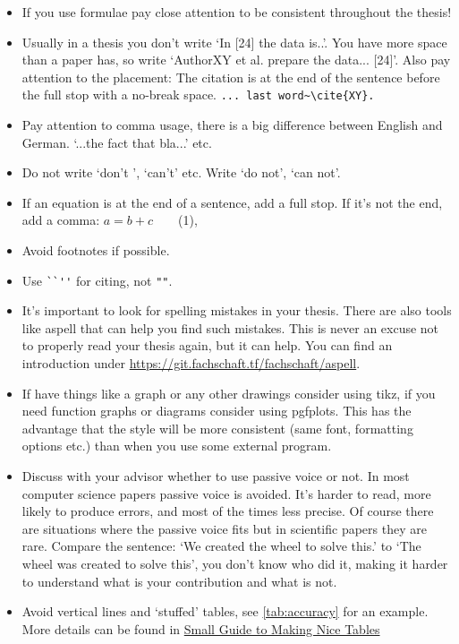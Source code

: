    \begin{itemize}

        \item If you use formulae pay close attention to be consistent throughout the thesis!

        \item Usually  in a thesis you don't write `In [24] the data is..'. You have more space than a paper has, so write `AuthorXY et al. prepare the data... [24]'. Also pay attention to the placement: The citation is at the end of the sentence before the full stop with a no-break space. \verb|... last word~\cite{XY}.|

        \item Pay attention to comma usage, there is a big difference between English and German. `...the fact that bla...' etc.

        \item Do not write `don't ', `can't' etc. Write `do not', `can not'.

        \item If an equation is at the end of a sentence, add a full stop. If it's not the end, add a comma: {$a= b + c$~~~~(1),}

        \item Avoid footnotes if possible.

        \item Use \verb|``''| for citing, not \verb|""|.

        \item It's important to look for spelling mistakes in your thesis. There are also tools like aspell that can help you find such mistakes.
        This is never an excuse not to properly read your thesis again, but it can help.
        You can find an introduction under \url{https://git.fachschaft.tf/fachschaft/aspell}.

        \item If have things like a graph or any other drawings consider using tikz, if you need function graphs or diagrams consider using pgfplots.
        This has the advantage that the style will be more consistent (same font, formatting options etc.) than when you use some external program.

        \item Discuss with your advisor whether to use passive voice or not. In most computer science papers passive voice is avoided. It's harder to read, more likely to produce errors, and most of the times less precise. Of course there are situations where the passive voice fits but in scientific papers they are rare. Compare the sentence: `We created the wheel to solve this.' to `The wheel was created to solve this', you don't know who did it, making it harder to understand what is your contribution and what is not.
        
        \item Avoid vertical lines and `stuffed' tables, see \ref{tab:accuracy} for an example. More details can be found in \href{https://www.inf.ethz.ch/personal/markusp/teaching/guides/guide-tables.pdf}{Small Guide to Making Nice Tables}

    \end{itemize}

